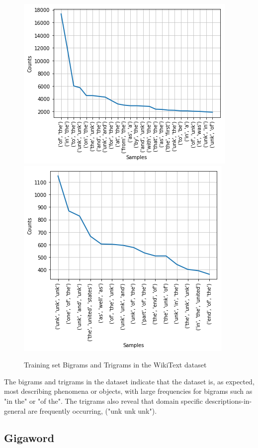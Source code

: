 \documentclass[a4paper]{article}
\begin{document}
\begin{figure}[!ht]
\includegraphics[width=0.8\columnwidth]{sr-eda-wikitext-bigrams}
\includegraphics[width=0.8\columnwidth]{sr-eda-wikitext-trigrams}
\centering
\caption{Training set Bigrams and Trigrams in the WikiText dataset}
\end{figure}

The bigrams and trigrams in the dataset indicate that the dataset is, as expected,
most describing phenomena or objects, with large frequencies for bigrams
such as "in the" or "of the". The trigrams also reveal that domain specific
descriptions-in-general are frequently occurring, ("unk unk unk").

\subsection{Gigaword}
\label{sec:gigaword}
\end{document}
